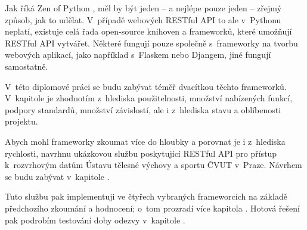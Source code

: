 Jak říká Zen of Python \autocite{PEP20}, měl by být jeden -- a nejlépe pouze jeden -- zřejmý způsob, jak to udělat. V~případě webových RESTful API to ale v~Pythonu neplatí, existuje celá řada open-source knihoven a frameworků, které umožňují RESTful API vytvářet. Některé fungují pouze společně s~frameworky na tvorbu webových aplikací, jako například s~Flaskem nebo Djangem, jiné fungují samostatně.

V~této diplomové práci se budu zabývat téměř dvacítkou těchto frameworků. V~kapitole \emph{} je zhodnotím z~hlediska použitelnosti, množství nabízených funkcí, podpory standardů, množství závislostí, ale i z~hlediska stavu a oblíbenosti projektu.

Abych mohl frameworky zkoumat více do hloubky a porovnat je i z~hlediska rychlosti, navrhnu ukázkovou službu poskytující RESTful API pro přístup k~rozvrhovým datům Ústavu tělesné výchovy a sportu ČVUT v~Praze. Návrhem se budu zabývat v~kapitole \emph{}.

Tuto službu pak implementuji ve čtyřech vybraných frameworcích na základě předchozího zkoumání a hodnocení; o~tom prozradí více kapitola \emph{}. Hotová řešení pak podrobím testování doby odezvy v~kapitole \emph{}.
